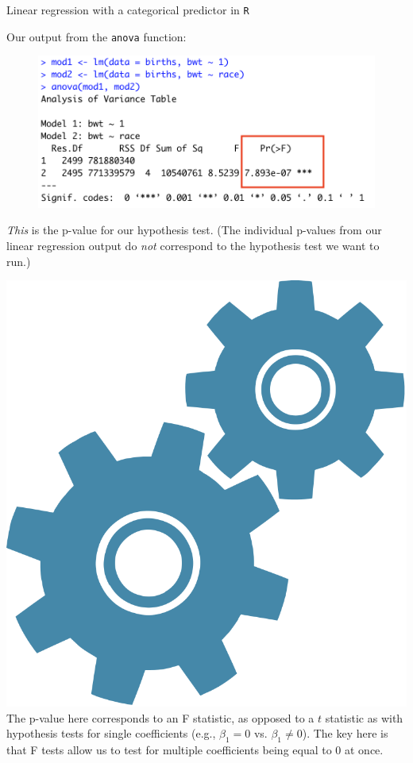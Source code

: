 \documentclass[10pt,t]{beamer}
\begin{document}
\begin{frame}{Linear regression with a categorical predictor in \texttt{R}}
	\vspace{-5mm}
	
Our output from the \texttt{anova} function:

\vspace{0.15cm}

\begin{figure}
	\centering \includegraphics[scale=0.5]{figures/anova_race2.png}
\end{figure}

\vspace{0.15cm}

\textit{This} is the p-value for our hypothesis test. (The individual p-values from our linear regression output do \textit{not} correspond to the hypothesis test we want to run.) \pause

\vspace{0.3cm}


\includegraphics[scale=0.01]{figures/technical} The p-value here corresponds to an F statistic, as opposed to a $t$ statistic as with hypothesis tests for single coefficients (e.g., $\beta_1 = 0$ vs. $\beta_1 \neq 0$). The key here is that F tests allow us to test for multiple coefficients being equal to $0$ at once.

\end{frame}
\end{document}
